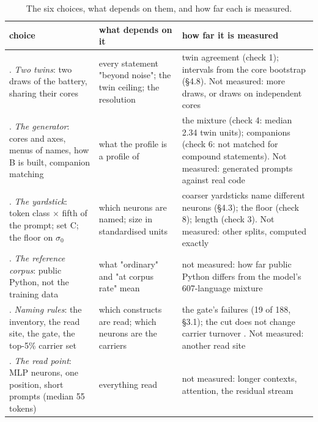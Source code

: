\documentclass{article}
\begin{document}
\begin{table}[t]
\centering
\scriptsize
\renewcommand{\arraystretch}{1.25}
\setcounter{table}{2}
\caption{The six choices, what depends on them, and how far each is measured.}
\label{tab:3}
\vspace{3pt}
\begin{tabular}{@{}>{\raggedright\arraybackslash}p{0.3333\dimexpr\textwidth-4\tabcolsep\relax}>{\raggedright\arraybackslash}p{0.3333\dimexpr\textwidth-4\tabcolsep\relax}>{\raggedright\arraybackslash}p{0.3333\dimexpr\textwidth-4\tabcolsep\relax}@{}}
\toprule
choice & what depends on it & how far it is measured \\
\midrule
1. \emph{Two twins}: two draws of the battery, sharing their cores & every statement "beyond noise"; the twin ceiling; the resolution & twin agreement (check 1); intervals from the core bootstrap (\S4.8). Not measured: more draws, or draws on independent cores \\\addlinespace[2.5pt]
2. \emph{The generator}: cores and axes, menus of names, how B is built, companion matching & what the profile is a profile of & the mixture (check 4: median 2.34 twin units); companions (check 6: not matched for compound statements). Not measured: generated prompts against real code \\\addlinespace[2.5pt]
3. \emph{The yardstick}: token class $\times$ fifth of the prompt; set C; the floor on $\sigma$$_0$ & which neurons are named; size in standardised units & coarser yardsticks name different neurons (\S4.3); the floor (check 8); length (check 3). Not measured: other splits, computed exactly \\\addlinespace[2.5pt]
4. \emph{The reference corpus}: public Python, not the training data & what "ordinary" and "at corpus rate" mean & not measured: how far public Python differs from the model's 607-language mixture \\\addlinespace[2.5pt]
5. \emph{Naming rules}: the inventory, the read site, the gate, the top-5\% carrier set & which constructs are read; which neurons are the carriers & the gate's failures (19 of 188, \S3.1); the cut does not change carrier turnover \citep{wilam2026}. Not measured: another read site \\\addlinespace[2.5pt]
6. \emph{The read point}: MLP neurons, one position, short prompts (median 55 tokens) & everything read & not measured: longer contexts, attention, the residual stream \\
\bottomrule
\end{tabular}
\end{table}
\end{document}
